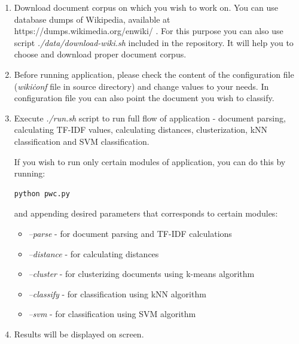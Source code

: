 \begin{enumerate}
	\item Download document corpus on which you wish to work on. You can use database dumps of Wikipedia, available at https://dumps.wikimedia.org/enwiki/ . For this purpose you can also use script \textit{./data/download-wiki.sh} included in the repository. It will help you to choose and download proper document corpus.
	
	\item Before running application, please check the content of the configuration file (\textit{wiki\.conf} file in source directory) and change values to your needs. In configuration file you can also point the document you wish to classify.
	
	\item Execute \textit{./run.sh} script to run full flow of application - document parsing, calculating TF-IDF values, calculating distances, clusterization, kNN classification and SVM classification. 
	
	If you wish to run only certain modules of application, you can do this by running:
	\begin{lstlisting}[language=Bash, numbers=none]
	python pwc.py
	\end{lstlisting}
	and appending desired parameters that corresponds to certain modules:
	\begin{itemize}
		\item \textit{--parse} - for document parsing and TF-IDF calculations
		\item \textit{--distance} - for calculating distances
		\item \textit{--cluster} - for clusterizing documents using k-means algorithm
		\item \textit{--classify} - for classification using kNN algorithm
		\item \textit{--svm} - for classification using SVM algorithm
	\end{itemize}
	
	\item Results will be displayed on screen.
\end{enumerate}